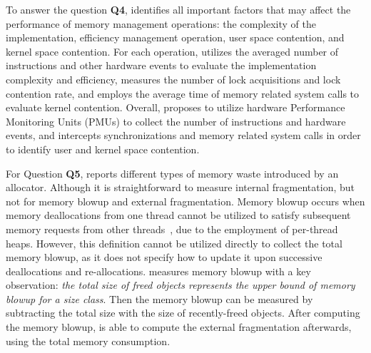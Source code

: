 To answer the question \textbf{Q4}, \MP{} identifies all important factors that may affect the performance of memory management operations: the complexity of the implementation, efficiency management operation, user space contention, and kernel space contention. For each operation, \MP{} utilizes the averaged number of instructions and other hardware events to evaluate the implementation complexity and efficiency, measures the number of lock acquisitions and lock contention rate, and employs the average time of memory related system calls to evaluate kernel contention. Overall, \MP{} proposes to utilize hardware Performance Monitoring Units (PMUs) to collect the number of instructions and hardware events, and intercepts synchronizations and memory related system calls in order to identify user and kernel space contention. 

For Question \textbf{Q5}, \MP{} reports different types of memory waste introduced by an allocator. Although it is straightforward to measure internal fragmentation, but not for memory blowup and external fragmentation. Memory blowup occurs when memory deallocations from one thread cannot be utilized to satisfy subsequent memory requests from other threads~\cite{Hoard}, due to the employment of per-thread heaps. However, this definition cannot be utilized directly to collect the total memory blowup, as it does not specify how to update it upon successive deallocations and re-allocations. \MP{} measures memory blowup with a key observation: \textit{the total size of freed objects represents the upper bound of memory blowup for a size class}. Then the memory blowup can be measured by subtracting the total size with the size of recently-freed objects. After computing the memory blowup, \MP{} is able to compute the external fragmentation afterwards, using the total memory consumption.



